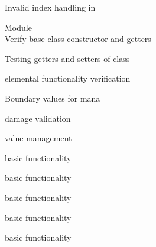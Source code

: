 \begin{DoxyRefList}
\label{test__test000027}%
%
Invalid index handling in   


\item[Module \doxylink{group__GCI}{GCI} ]\hfill \\
\label{test__test000001}%
%
Verify base  class constructor and getters  



\label{test__test000002}%
%
Testing getters and setters of  class  



\label{test__test000003}%
%
 elemental functionality verification  



\label{test__test000004}%
%
Boundary values for  mana  



\label{test__test000005}%
%
 damage validation  



\label{test__test000007}%
%
 value management  



\label{test__test000009}%
%
 basic functionality  



\label{test__test000011}%
%
 basic functionality  



\label{test__test000013}%
%
 basic functionality  



\label{test__test000015}%
%
 basic functionality  



\label{test__test000017}%
%
 basic functionality  




\end{DoxyRefList}
